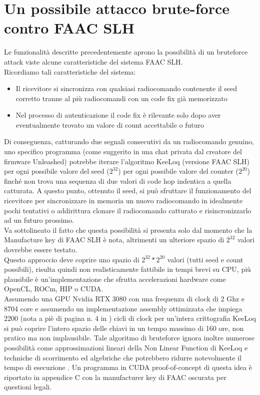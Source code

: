 \section{Un possibile attacco brute-force contro FAAC SLH}
\label{sec:attack}

Le funzionalità descritte precedentemente aprono la possibilità di un bruteforce attack viste alcune caratteristiche del sistema FAAC SLH.\\
Ricordiamo tali caratteristiche del sistema:
\begin{itemize}
  \item Il ricevitore si sincronizza con qualsiasi radiocomando contenente il seed corretto tranne al più radiocomandi con un code fix già memorizzato
  \item Nel processo di autenticazione il code fix è rilevante solo dopo aver eventualmente trovato un valore di count accettabile o futuro
\end{itemize}
Di conseguenza, catturando due segnali consecutivi da un radiocomando genuino, uno specifico programma (come suggerito in una chat privata dal creatore del firmware Unleashed) potrebbe iterare l’algoritmo KeeLoq (versione FAAC SLH) per ogni possibile valore del seed ($2^{32}$) per ogni possibile valore del counter ($2^{20}$) finché non trova una sequenza di due valori di code hop indentica a quella catturata. A questo punto, ottenuto il seed, si può sfruttare il funzionamento del ricevitore per sincronizzare in memoria un nuovo radiocomando in idealmente pochi tentativi o addirittura clonare il radiocomando catturato e risincronizzarlo ad un futuro prossimo.\\
Va sottolineato il fatto che questa possibilità si presenta solo dal momento che la Manufacture key di FAAC SLH è nota, altrimenti un ulteriore spazio di $2^{32}$ valori dovrebbe essere testato.\\
Questo approccio deve coprire uno spazio di $2^{32} * 2^{20}$ valori (tutti seed e count possibili), risulta quindi non realisticamente fattibile in tempi brevi su CPU, più plausibile è un’implementazione che sfrutta accelerazioni hardware come OpenCL, ROCm, HIP o CUDA.\\
Assumendo una GPU Nvidia RTX 3080 con una frequenza di clock di 2 Ghz e 8704 core e assumendo un implementazione assembly ottimizzata che impiega 2200 (nota a piè di pagina n. 4 in \cite{cryptoeprint}) cicli di clock per un'intera crittografia KeeLoq si può coprire l’intero spazio delle chiavi in un tempo massimo di 160 ore, non pratico ma non implausibile. Tale algoritmo di bruteforce ignora inoltre numerose possibilità come approssimazioni lineari della Non Linear Function di KeeLoq e techniche di scorrimento ed algebriche che potrebbero ridurre notevolmente il tempo di esecuzione \cite{cryptoeprint,algebraic_slide,attack,periodic_ciphers}.
Un programma in CUDA proof-of-concept di questa idea è riportato in appendice C con la manufacturer key di FAAC oscurata per questioni legali.
